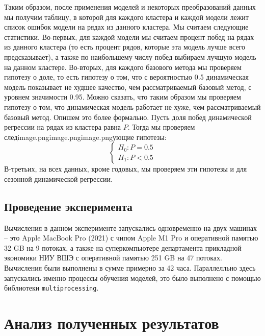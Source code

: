 \documentclass[a4paper,14pt]{extarticle}
\begin{document}
	Таким образом, после применения моделей и некоторых преобразований данных мы получим таблицу, в которой для каждого кластера и каждой модели
	лежит список ошибок модели на рядах из данного кластера. Мы считаем следующие статистики. Во-первых, для каждой модели мы считаем процент побед на рядах из данного кластера (то есть процент рядов, которые эта модель лучше всего предсказывает), а также по наибольшему числу побед выбираем лучшую модель на данном кластере. Во-вторых, для каждого базового метода мы проверяем гипотезу о доле, то есть гипотезу о том, что с вероятностью 0.5 динамическая модель показывает не худшее качество, чем рассматриваемый базовый метод, с уровнем значимости 0.95. Можно сказать, что таким образом мы проверяем гипотезу о том, что динамическая модель работает не хуже, чем рассматриваемый базовый метод. Опишем это более формально. Пусть доля побед динамической регрессии на рядах из кластера равна $P$. Тогда мы проверяем следimage.pngimage.pngimage.pngующие гипотезы:
	\begin{equation*}
		\begin{cases}
			H_0: P = 0.5 \\
			H_1: P < 0.5
		\end{cases}
	\end{equation*}
	В-третьих, на всех данных, кроме годовых, мы проверяем эти гипотезы и для сезонной динамической регрессии.

	\subsection{Проведение эксперимента}
	Вычисления в данном эксперименте запускались одновременно на двух машинах -- это Apple MacBook Pro (2021) с чипом Apple M1 Pro и оперативной памятью 32 GB на 9 потоках, а также на суперкомпьютере департамента прикладной экономики НИУ ВШЭ с оперативной памятью 251 GB на 47 потоках. Вычисления были выполнены в сумме примерно за 42 часа. Параллелльно здесь запускались именно процессы обучения моделей, это было выполнено с помощью библиотеки \texttt{multiprocessing}.

\section{Анализ полученных результатов}
\end{document}
